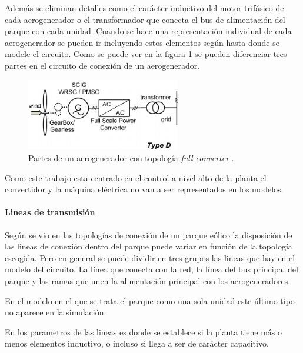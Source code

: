 \documentclass{book}
\begin{document}
Adem\'as se eliminan detalles como el car\'acter inductivo del motor trif\'asico de cada aerogenerador o el transformador que conecta el bus de alimentaci\'on del parque con cada unidad. Cuando se hace una representaci\'on individual de cada aerogenerador se pueden ir incluyendo estos elementos seg\'un hasta donde se modele el circuito. Como se puede ver en la figura \ref{FullConverter} se pueden diferenciar tres partes en el circuito de conexi\'on de un aerogenerador. 

\begin{figure}[h!]
\centering
\includegraphics[width=0.6\textwidth]{FullConverter.PNG}
\caption{Partes de un aerogenerador con topolog\'ia \emph{full converter} \cite{FullConFig}. }
\label{FullConverter}
\end{figure} \par

Como este trabajo esta centrado en el control a nivel alto de la planta el convertidor y la m\'aquina el\'ectrica no van a ser representados en los modelos. \par
		
		\paragraph{Lineas de transmisi\'on}

Seg\'un se vio en las topolog\'ias de conexi\'on de un parque e\'olico la disposici\'on de las lineas de conexi\'on dentro del parque puede variar en funci\'on de la topolog\'ia escogida. Pero en general se puede dividir en tres grupos las lineas que hay en el modelo del circuito. La l\'inea que conecta con la red, la l\'inea del bus principal del parque y las ramas que unen la alimentaci\'on principal con los aerogeneradores. \par

En el modelo en el que se trata el parque como una sola unidad este \'ultimo tipo no aparece en la simulaci\'on. \par

En los parametros de las lineas es donde se establece si la planta tiene más o menos elementos inductivo, o incluso si llega a ser de car\'acter capacitivo. \par
\end{document}
